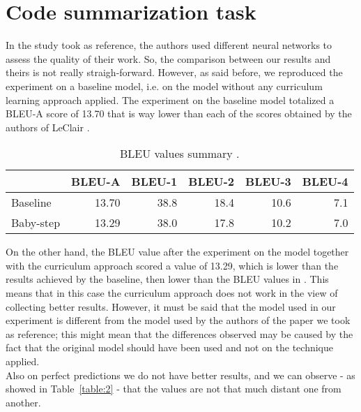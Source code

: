 \section{Code summarization task}
In the study took as reference, the authors used different neural networks to 
assess the quality of their work. So, the comparison between our results and theirs
is not really straigh-forward. However, as said before, we reproduced the experiment on a baseline model,
i.e. on the model without any curriculum learning approach applied.
The experiment on the baseline model totalized a BLEU-A score of 13.70 that is way lower than 
each of the scores obtained by the authors of LeClair \cite{Leclair2020}. 
\begin{table}[h!]
    \centering
    \begin{tabular}{l|r|r|r|r|r}
     & BLEU-A & BLEU-1 & BLEU-2 & BLEU-3 & BLEU-4\\ [0.5ex] 
     \hline
     Baseline & 13.70 & 38.8 & 18.4 & 10.6 & 7.1\\  
     Baby-step & 13.29 & 38.0 & 17.8 & 10.2 & 7.0\\ [1ex]
     \end{tabular}
    \caption{BLEU values summary .}
    \label{table:1}
    \end{table}
On the other hand, the BLEU value after the experiment on the model together with the curriculum approach
scored a value of 13.29, which is lower than the results achieved by the baseline, then lower than the BLEU values in \cite{Leclair2020}.
This means that in this case the curriculum approach does not work in the view of collecting better results.
However, it must be said that the model used in our experiment is different from the 
model used by the authors of the paper we took as reference; this might mean that the differences observed
may be caused by the fact that the original model should have been used and not on the technique applied.\\
Also on perfect predictions we do not have better results, and we can observe - as showed in Table~\ref{table:2} - that the values are not 
that much distant one from another.
